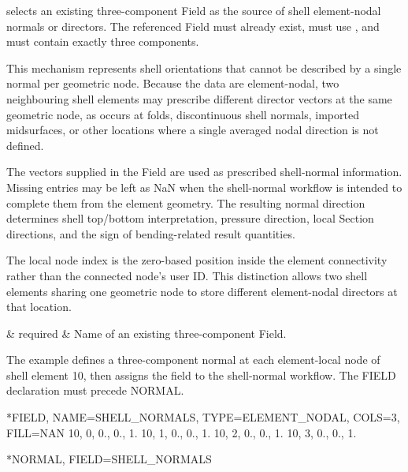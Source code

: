 
 selects an existing three-component  Field as the source of shell element-nodal normals or directors. The referenced Field must already exist, must use , and must contain exactly three components.

This mechanism represents shell orientations that cannot be described by a single normal per geometric node. Because the data are element-nodal, two neighbouring shell elements may prescribe different director vectors at the same geometric node, as occurs at folds, discontinuous shell normals, imported midsurfaces, or other locations where a single averaged nodal direction is not defined.

The vectors supplied in the Field are used as prescribed shell-normal information. Missing entries may be left as NaN when the shell-normal workflow is intended to complete them from the element geometry. The resulting normal direction determines shell top/bottom interpretation, pressure direction, local Section directions, and the sign of bending-related result quantities.

The local node index is the zero-based position inside the element connectivity rather than the connected node's user ID. This distinction allows two shell elements sharing one geometric node to store different element-nodal directors at that location.

\begin{keywordparameters}
 & required & Name of an existing three-component  Field. \\
\end{keywordparameters}

The example defines a three-component normal at each element-local node of shell element 10, then assigns the field to the shell-normal workflow. The FIELD declaration must precede NORMAL.

\exampleheading

\begin{inputdeck}
*FIELD, NAME=SHELL_NORMALS,
 TYPE=ELEMENT_NODAL, COLS=3, FILL=NAN
10, 0, 0., 0., 1.
10, 1, 0., 0., 1.
10, 2, 0., 0., 1.
10, 3, 0., 0., 1.

*NORMAL, FIELD=SHELL_NORMALS
\end{inputdeck}
